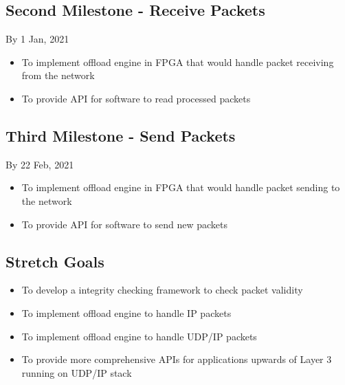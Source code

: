 \documentclass[a4paper,11pt]{scrartcl}
\begin{document}
\subsection{Second Milestone - Receive Packets}
By 1 Jan, 2021
\begin{itemize}
    \item To implement offload engine in FPGA that would handle packet receiving from the network
    \item To provide API for software to read processed packets
\end{itemize}

\subsection{Third Milestone - Send Packets}
By 22 Feb, 2021
\begin{itemize}
    \item To implement offload engine in FPGA that would handle packet sending to the network
    \item To provide API for software to send new packets
\end{itemize}

\subsection{Stretch Goals}
\begin{itemize}
    \item To develop a integrity checking framework to check packet validity
    \item To implement offload engine to handle IP packets
    \item To implement offload engine to handle UDP/IP packets
    \item To provide more comprehensive APIs for applications upwards of Layer 3 running on UDP/IP stack
\end{itemize}



\end{document}

